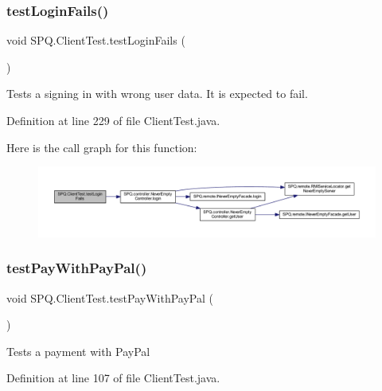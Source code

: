 \subsubsection{\texorpdfstring{test\+Login\+Fails()}{testLoginFails()}}
{\footnotesize\ttfamily void S\+P\+Q.\+Client\+Test.\+test\+Login\+Fails (\begin{DoxyParamCaption}{ }\end{DoxyParamCaption})}

Tests a signing in with wrong user data. It is expected to fail. 

Definition at line 229 of file Client\+Test.\+java.

Here is the call graph for this function\+:\nopagebreak
\begin{figure}[H]
\begin{center}
\leavevmode
\includegraphics[width=350pt]{class_s_p_q_1_1_client_test_ac05d043ac92f1c1083d19eec58e5bbd9_cgraph}
\end{center}
\end{figure}
\mbox{\label{class_s_p_q_1_1_client_test_afe92931ed84ed471c853004681be4072}} 
\subsubsection{\texorpdfstring{test\+Pay\+With\+Pay\+Pal()}{testPayWithPayPal()}}
{\footnotesize\ttfamily void S\+P\+Q.\+Client\+Test.\+test\+Pay\+With\+Pay\+Pal (\begin{DoxyParamCaption}{ }\end{DoxyParamCaption})}

Tests a payment with Pay\+Pal 

Definition at line 107 of file Client\+Test.\+java.

